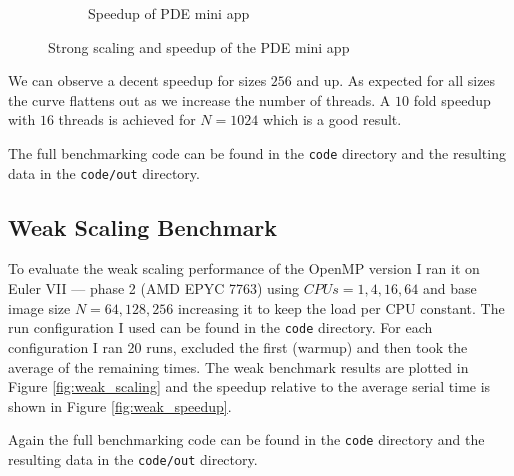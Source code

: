 \documentclass[unicode,11pt,a4paper,oneside,numbers=endperiod,openany]{scrartcl}
\begin{document}
\begin{figure}[h!t]
\begin{subfigure}{.5\textwidth}
        \caption{Speedup of PDE mini app}
        \label{fig:strong_speedup}
    \end{subfigure}
    \caption{Strong scaling and speedup of the PDE mini app}
\end{figure}

We can observe a decent speedup for sizes $256$ and up. As expected for all sizes the curve flattens out as we increase the number of threads. A $10$ fold speedup with $16$ threads is achieved for $N=1024$ which is a good result.

The full benchmarking code can be found in the \texttt{code} directory and the resulting data in the \texttt{code/out} directory.

\subsection{Weak Scaling Benchmark}

To evaluate the weak scaling performance of the OpenMP version I ran it on Euler VII — phase 2 (AMD EPYC 7763) using $CPUs=1, 4, 16, 64$ and base image size $N=64, 128, 256$ increasing it to keep the load per CPU constant. The run configuration I used can be found in the \texttt{code} directory. For each configuration I ran 20 runs, excluded the first (warmup) and then took the average of the remaining times. The weak benchmark results are plotted in Figure \ref{fig:weak_scaling} and the speedup relative to the average serial time is shown in Figure \ref{fig:weak_speedup}.

Again the full benchmarking code can be found in the \texttt{code} directory and the resulting data in the \texttt{code/out} directory.
\end{document}
